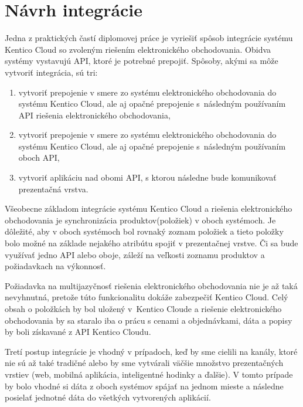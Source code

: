 \documentclass[
  printed, %
  table,   %
  lof,     %
  nolot,     %
  twoside,  
]{fithesis3}
\begin{document}
\section{Návrh integrácie}
Jedna z praktických častí diplomovej práce je vyriešiť spôsob integrácie systému Kentico Cloud so zvoleným riešením elektronického obchodovania. Obidva systémy vystavujú API, ktoré je potrebné prepojiť. Spôsoby, akými sa môže vytvoriť integrácia, sú tri: 
\begin{enumerate}
	\item vytvoriť prepojenie v smere zo systému elektronického obchodovania do systému Kentico Cloud, ale aj opačné prepojenie s~následným používaním API riešenia elektronického obchodovania,
	\item vytvoriť prepojenie v smere zo systému elektronického obchodovania do systému Kentico Cloud, ale aj opačné prepojenie s~následným používaním oboch API,
	\item vytvoriť aplikáciu nad obomi API, s ktorou následne bude komunikovať prezentačná vrstva.
\end{enumerate}

Všeobecne základom integrácie systému Kentico Cloud a riešenia elektronického obchodovania je synchronizácia produktov(položiek) v oboch systémoch. Je dôležité, aby v oboch systémoch bol rovnaký zoznam položiek a tieto položky bolo možné na základe nejakého atribútu spojiť v prezentačnej vrstve. Či sa bude využívať jedno API alebo oboje, záleží na veľkosti zoznamu produktov a požiadavkach na výkonnosť.

Požiadavka na multijazyčnosť riešenia elektronického obchodovania nie je až taká nevyhnutná, pretože túto funkcionalitu dokáže zabezpečiť Kentico Cloud. Celý obsah o položkách by bol uložený v~Kentico Cloude a riešenie elektronického obchodovania by sa staralo iba o prácu s cenami a objednávkami, dáta a popisy by boli získavané z API Kentico Cloudu. 

Tretí postup integrácie je vhodný v prípadoch, keď by sme cielili na kanály, ktoré nie sú až také tradičné alebo by sme vytvárali väčšie množstvo prezentačných vrstiev (web, mobilná aplikácia, inteligentné hodinky a ďalšie). V tomto prípade by bolo vhodné si dáta z oboch systémov spájať na jednom mieste a následne posielať jednotné dáta do všetkých vytvorených aplikácií.
\end{document}
